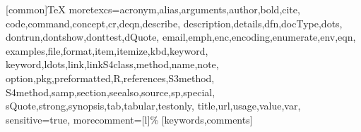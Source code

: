 \RequirePackage{listings}
\RequirePackage{Sweave}
\usepackage{xcolor}

%
\RequirePackage{color}
[common]{TeX}%
  {moretexcs={acronym,alias,arguments,author,bold,cite,%
          code,command,concept,cr,deqn,describe,%
          description,details,dfn,docType,dots,%
          dontrun,dontshow,donttest,dQuote,%
          email,emph,enc,encoding,enumerate,env,eqn,%
          examples,file,format,item,itemize,kbd,keyword,%
          keyword,ldots,link,linkS4class,method,name,note,%
          option,pkg,preformatted,R,references,S3method,%
          S4method,samp,section,seealso,source,sp,special,%
          sQuote,strong,synopsis,tab,tabular,testonly,%
          title,url,usage,value,var},
   sensitive=true,%
   morecomment=[l]\%%
}[keywords,comments]%
%
%
\global\def\Rlstset{\lstset{style=Rstyle}}%
\global\def\Rdlstset{\lstset{style=Rdstyle}}%
\Rlstset
%
